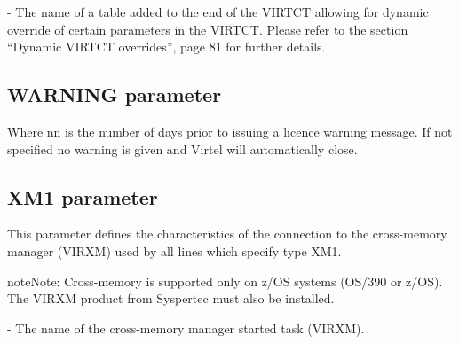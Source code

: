 \documentclass[letterpaper,10pt,english]{sphinxmanual}
\begin{document}
 - The name of a table added to the end of the VIRTCT allowing for dynamic override of certain parameters in the VIRTCT. Please refer to the section “Dynamic VIRTCT overrides”, page 81 for further details.


\subsection{WARNING parameter}
\label{\detokenize{Installation_Guide:warning-parameter}}\label{\detokenize{Installation_Guide:index-139}}
\begin{sphinxVerbatim}[commandchars=\\\{\}]
\end{sphinxVerbatim}

Where nn is the number of days prior to issuing a licence warning message. If not specified no warning is given and Virtel will automatically close.


\subsection{XM1 parameter}
\label{\detokenize{Installation_Guide:xm1-parameter}}\label{\detokenize{Installation_Guide:index-140}}
\begin{sphinxVerbatim}[commandchars=\\\{\}]
   
\PYG{p}{[}\PYG{p}{]}
\end{sphinxVerbatim}

This parameter defines the characteristics of the connection to the cross-memory manager (VIRXM) used by all lines which specify type XM1.

\begin{sphinxadmonition}{note}{Note:}
Cross-memory is supported only on z/OS systems (OS/390 or z/OS). The VIRXM product from Syspertec must also be installed.
\end{sphinxadmonition}

 - The name of the cross-memory manager started task (VIRXM).
\end{document}
